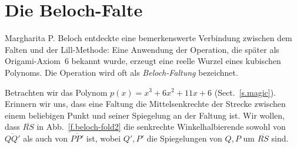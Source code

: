 
\section{Die Beloch-Falte}\label{s.beloch-fold}

Margharita P. Beloch entdeckte eine bemerkenswerte Verbindung zwischen dem Falten und der Lill-Methode: Eine Anwendung der Operation, die später als Origami-Axiom~6 bekannt wurde, erzeugt eine reelle Wurzel eines kubischen Polynoms. Die Operation wird oft als \emph{Beloch-Faltung} bezeichnet.

Betrachten wir das Polynom $p(x)=x^3+6x^2+11x+6$ (Sect.~\ref{s.magic}). Erinnern wir uns, dass eine Faltung die Mittelsenkrechte der Strecke zwischen einem beliebigen Punkt und seiner Spiegelung an der Faltung ist. Wir wollen, dass $\overline{RS}$ in Abb.~\ref{f.beloch-fold2} die senkrechte Winkelhalbierende sowohl von $\overline{QQ'}$ als auch von $\overline{PP'}$ ist, wobei $Q',P'$ die Spiegelungen von $Q,P$ um $\overline{RS}$ sind.

